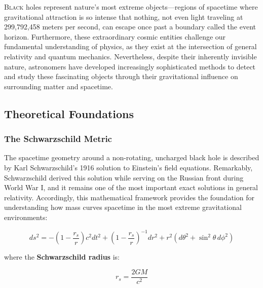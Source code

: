 \documentclass[11pt,a4paper]{article}
\begin{document}
\lettrine[lines=3, loversize=0.1, nindent=0.5em]{B}{lack} holes represent nature's most extreme objects---regions of spacetime where gravitational attraction is so intense that nothing, not even light traveling at 299,792,458 meters per second, can escape once past a boundary called the event horizon. Furthermore, these extraordinary cosmic entities challenge our fundamental understanding of physics, as they exist at the intersection of general relativity and quantum mechanics. Nevertheless, despite their inherently invisible nature, astronomers have developed increasingly sophisticated methods to detect and study these fascinating objects through their gravitational influence on surrounding matter and spacetime.

\subsection{Theoretical Foundations}

\subsubsection{The Schwarzschild Metric}

The spacetime geometry around a non-rotating, uncharged black hole is described by Karl Schwarzschild's 1916 solution to Einstein's field equations. Remarkably, Schwarzschild derived this solution while serving on the Russian front during World War I, and it remains one of the most important exact solutions in general relativity. Accordingly, this mathematical framework provides the foundation for understanding how mass curves spacetime in the most extreme gravitational environments:

\begin{equationbox}
\begin{equation}
ds^2 = -\left(1 - \frac{r_s}{r}\right)c^2 dt^2 + \left(1 - \frac{r_s}{r}\right)^{-1} dr^2 + r^2(d\theta^2 + \sin^2\theta \, d\phi^2)
\label{eq:schwarzschild}
\end{equation}
\end{equationbox}

where the \textbf{Schwarzschild radius} is:

\begin{equationbox}
\begin{equation}
r_s = \frac{2GM}{c^2}
\label{eq:schwarzschild_radius}
\end{equation}
\end{equationbox}
\end{document}
